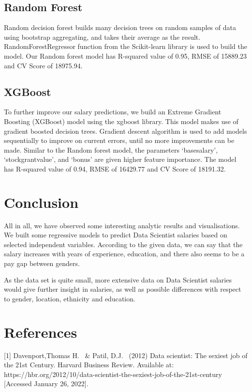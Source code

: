 \documentclass{article}
\begin{document}
\subsection{Random Forest}
Random decision forest builds many decision trees on random samples of data using bootstrap aggregating, and takes their average as the result. RandomForestRegressor function from the Scikit-learn library is used to build the model. Our Random forest model has R-squared value of 0.95, RMSE of 15889.23 and CV Score of 18975.94.



\subsection{XGBoost}
To further improve our salary predictions, we build an Extreme Gradient Boosting (XGBoost) model using the xgboost library. This model makes use of gradient boosted decision trees. Gradient descent algorithm is used to add models sequentially to improve on current errors, until no more improvements can be made. Similar to the Random forest model, the parameters ‘basesalary', ‘stockgrantvalue', and ‘bonus' are given higher feature importance. The model has R-squared value of 0.94, RMSE of 16429.77 and CV Score of 18191.32.



\section{Conclusion}
All in all, we have observed some interesting analytic results and visualisations. We built some regressive models to predict Data Scientist salaries based on selected independent variables. According to the given data, we can say that the salary increases with years of experience, education, and there also seems to be a pay gap between genders.

As the data set is quite small, more extensive data on Data Scientist salaries would give further insight in salaries, as well as possible differences with respect to gender, location, ethnicity and education.

\section*{References}

{
\small

 [1] Davenport,Thomas H. \ \&  Patil, D.J. \ (2012) Data scientist: The sexiest job of the 21st Century. Harvard Business Review. Available at: https://hbr.org/2012/10/data-scientist-the-sexiest-job-of-the-21st-century [Accessed January 26, 2022].}
 
\end{document}
